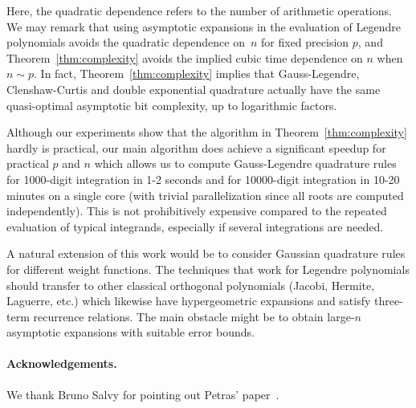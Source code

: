 \documentclass[11pt,a4paper]{article}
\begin{document}
Here, the quadratic dependence refers to the number of arithmetic operations.
We may remark that using asymptotic expansions in the
evaluation of Legendre polynomials avoids the quadratic
dependence on~$n$ for fixed precision $p$, and Theorem~\ref{thm:complexity}
avoids the implied cubic time dependence on $n$ when $n \sim p$.
In fact, Theorem~\ref{thm:complexity} implies that
Gauss-Legendre, Clenshaw-Curtis and double exponential
quadrature actually have the same quasi-optimal asymptotic bit complexity,
up to logarithmic factors.

Although our experiments show that the algorithm in Theorem~\ref{thm:complexity}
hardly is practical, our main algorithm does achieve a
significant speedup for practical $p$ and $n$
which allows us to compute Gauss-Legendre quadrature rules for
1000-digit integration in 1-2 seconds and for 10000-digit integration in 10-20 minutes
on a single core (with trivial parallelization since all roots
are computed independently). This is not prohibitively
expensive compared to the repeated evaluation
of typical integrands, especially if several integrations are needed.

A natural extension of this work would be to
consider Gaussian quadrature rules for different
weight functions.
The techniques that work for Legendre polynomials should transfer to other
classical orthogonal polynomials (Jacobi, Hermite, Laguerre, etc.)
which likewise have hypergeometric expansions
and satisfy three-term recurrence relations.
The main obstacle might be
to obtain large-$n$ asymptotic expansions with suitable error bounds.

\paragraph*{Acknowledgements.}

We thank Bruno Salvy for pointing out Petras' paper~\cite{petras1999computation}.



\end{document}
